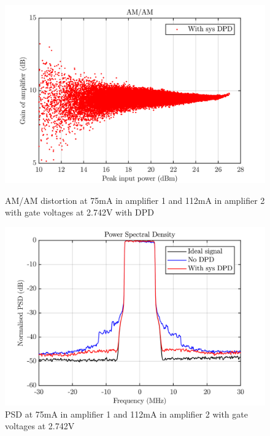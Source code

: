 \begin{figure}[H]
  \centering
  \begin{minipage}[b]{0.5\textwidth}
	\includegraphics[scale = 0.5]{figures/measurement/cree/meas5/amam_sys_dpd_2p742v.png}
	\caption{AM/AM distortion at 75mA in amplifier 1 and 112mA in amplifier 2 with gate voltages at 2.742V with DPD}	
    \label{fig:meas5_5}
  \end{minipage}
  \hfill
  \begin{minipage}[b]{0.4\textwidth}
	\includegraphics[scale = 0.5]{figures/measurement/cree/meas5/psd_2p742v.png}
	\caption{PSD at 75mA in amplifier 1 and 112mA in amplifier 2 with gate voltages at 2.742V}
    \label{fig:meas5_6}
  \end{minipage}
\end{figure}


